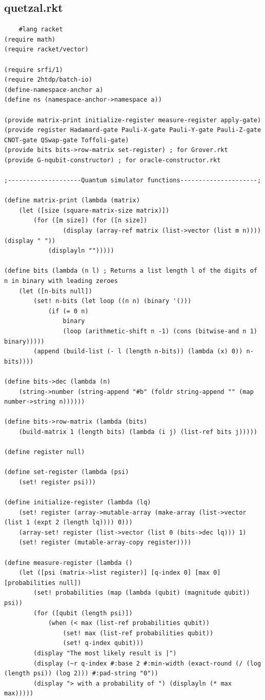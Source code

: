 \documentclass[11pt]{article}
\begin{document}
\begin{appendices}
	\section{quetzal.rkt}
	\begin{lstlisting}
	#lang racket
(require math)
(require racket/vector)

(require srfi/1)
(require 2htdp/batch-io)
(define-namespace-anchor a)
(define ns (namespace-anchor->namespace a))

(provide matrix-print initialize-register measure-register apply-gate)
(provide register Hadamard-gate Pauli-X-gate Pauli-Y-gate Pauli-Z-gate CNOT-gate QSwap-gate Toffoli-gate)
(provide bits bits->row-matrix set-register) ; for Grover.rkt
(provide G-nqubit-constructor) ; for oracle-constructor.rkt

;--------------------Quantum simulator functions---------------------;

(define matrix-print (lambda (matrix)
	(let ([size (square-matrix-size matrix)])
		(for ([m size]) (for ([n size])
				(display (array-ref matrix (list->vector (list m n)))) (display " "))
			(displayln "")))))

(define bits (lambda (n l) ; Returns a list length l of the digits of n in binary with leading zeroes
	(let ([n-bits null])
		(set! n-bits (let loop ((n n) (binary '()))
			(if (= 0 n) 
				binary
				(loop (arithmetic-shift n -1) (cons (bitwise-and n 1) binary)))))
		(append (build-list (- l (length n-bits)) (lambda (x) 0)) n-bits))))

(define bits->dec (lambda (n)
	(string->number (string-append "#b" (foldr string-append "" (map number->string n))))))

(define bits->row-matrix (lambda (bits)
	(build-matrix 1 (length bits) (lambda (i j) (list-ref bits j)))))

(define register null)

(define set-register (lambda (psi)
	(set! register psi)))

(define initialize-register (lambda (lq)
	(set! register (array->mutable-array (make-array (list->vector (list 1 (expt 2 (length lq)))) 0)))
	(array-set! register (list->vector (list 0 (bits->dec lq))) 1)
	(set! register (mutable-array-copy register))))

(define measure-register (lambda ()
	(let ([psi (matrix->list register)] [q-index 0] [max 0] [probabilities null])
		(set! probabilities (map (lambda (qubit) (magnitude qubit)) psi))
		(for ([qubit (length psi)])
			(when (< max (list-ref probabilities qubit))
				(set! max (list-ref probabilities qubit))
				(set! q-index qubit)))
		(display "The most likely result is |") 
		(display (~r q-index #:base 2 #:min-width (exact-round (/ (log (length psi)) (log 2))) #:pad-string "0"))
		(display "> with a probability of ") (displayln (* max max)))))


\end{lstlisting}
\end{appendices}
\end{document}

